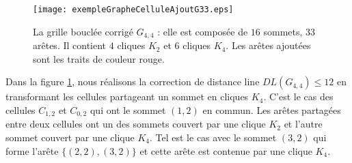 \begin{figure}[htb!] 
\centering
\texttt{[image: exempleGrapheCelluleAjoutG33.eps]}
\caption{ La grille boucl\'ee  corrig\'e $G_{4,4}$ : elle est compos\'ee de $16$ sommets, $33$ ar\^etes. Il contient $4$ cliques $K_{2}$ et $6$ cliques $K_4$. Les ar\^etes ajout\'ees sont les traits de couleur rouge.}
\label{exempleCorrectionGrapheCelluleAvecAjout}
\end{figure}
Dans la figure \ref{exempleCorrectionGrapheCelluleAvecAjout}, nous r\'ealisons la correction de distance line $DL(G_{4,4})  \le 12$ en transformant les cellules partageant un sommet en cliques $K_4$. C'est le cas des cellules $C_{1,2}$ et  $C_{0,2}$ qui ont le sommet $(1,2)$ en commun. 
Les ar\^etes partag\'ees entre deux cellules ont un des sommets couvert par une clique $K_2$ et l'autre sommet couvert par une clique $K_4$. Tel est le cas avec le sommet $(3,2)$ qui forme l'ar\^ete $\{(2,2),(3,2)\}$ et cette ar\^ete est contenue par une clique $K_4$.






